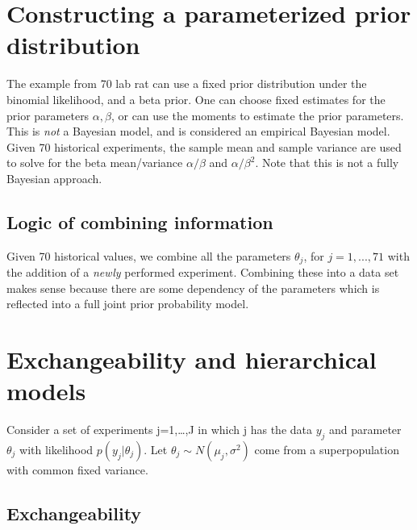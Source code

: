\documentclass[
]{book}
\theoremstyle{definition}
\theoremstyle{definition}
\theoremstyle{definition}
\theoremstyle{definition}
\theoremstyle{remark}
\begin{document}
\hypertarget{constructing-a-parameterized-prior-distribution}{%
\section{Constructing a parameterized prior distribution}\label{constructing-a-parameterized-prior-distribution}}

The example from 70 lab rat can use a fixed prior distribution under the binomial likelihood, and a beta prior. One can choose fixed estimates for the prior parameters \(\alpha,\beta\), or can use the moments to estimate the prior parameters. This is \emph{not} a Bayesian model, and is considered an empirical Bayesian model. Given 70 historical experiments, the sample mean and sample variance are used to solve for the beta mean/variance \(\alpha/\beta\) and \(\alpha/\beta^2\). Note that this is not a fully Bayesian approach.

\hypertarget{logic-of-combining-information}{%
\subsection*{Logic of combining information}\label{logic-of-combining-information}}

Given 70 historical values, we combine all the parameters \(\theta_j\), for \(j=1,...,71\) with the addition of a \emph{newly} performed experiment. Combining these into a data set makes sense because there are some dependency of the parameters which is reflected into a full joint prior probability model.

\hypertarget{exchangeability-and-hierarchical-models}{%
\section{Exchangeability and hierarchical models}\label{exchangeability-and-hierarchical-models}}

Consider a set of experiments j=1,\ldots,J in which j has the data \(y_j\) and parameter \(\theta_j\) with likelihood \(p(y_j|\theta_j)\). Let \(\theta_j \sim N(\mu_j,\sigma^2)\) come from a superpopulation with common fixed variance.

\hypertarget{exchangeability-1}{%
\subsection*{Exchangeability}\label{exchangeability-1}}
\end{document}
